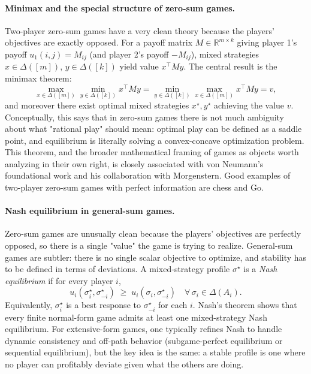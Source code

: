 \documentclass{article}
\begin{document}
\paragraph{Minimax and the special structure of zero-sum games.}
Two-player zero-sum games have a very clean theory because the players’ objectives are exactly opposed. For a payoff matrix \(M\in \mathbb{R}^{m\times k}\) giving player 1’s payoff \(u_1(i,j)=M_{ij}\) (and player 2’s payoff \(-M_{ij}\)), mixed strategies \(x\in \Delta([m])\), \(y\in \Delta([k])\) yield value \(x^\top M y\). The central result is the minimax theorem:
\[
\max_{x\in \Delta([m])}\min_{y\in \Delta([k])} x^\top M y
=
\min_{y\in \Delta([k])}\max_{x\in \Delta([m])} x^\top M y
= v,
\]
and moreover there exist optimal mixed strategies \(x^\star,y^\star\) achieving the value \(v\). Conceptually, this says that in zero-sum games there is not much ambiguity about what "rational play" should mean: optimal play can be defined as a saddle point, and equilibrium is literally solving a convex-concave optimization problem. This theorem, and the broader mathematical framing of games as objects worth analyzing in their own right, is closely associated with von Neumann’s foundational work and his collaboration with Morgenstern. Good examples of two-player zero-sum games with perfect information are chess and Go.

\paragraph{Nash equilibrium in general-sum games.}
Zero-sum games are unusually clean because the players’ objectives are perfectly opposed, so there is a single "value" the game is trying to realize. General-sum games are subtler: there is no single scalar objective to optimize, and stability has to be defined in terms of deviations. A mixed-strategy profile \(\sigma^\star\) is a \emph{Nash equilibrium} if for every player \(i\),
\[
u_i(\sigma_i^\star,\sigma_{-i}^\star)\;\ge\;u_i(\sigma_i,\sigma_{-i}^\star)
\quad \forall\,\sigma_i\in \Delta(A_i).
\]
Equivalently, \(\sigma_i^\star\) is a best response to \(\sigma_{-i}^\star\) for each \(i\). Nash’s theorem shows that every finite normal-form game admits at least one mixed-strategy Nash equilibrium. For extensive-form games, one typically refines Nash to handle dynamic consistency and off-path behavior (subgame-perfect equilibrium or sequential equilibrium), but the key idea is the same: a stable profile is one where no player can profitably deviate given what the others are doing.
\end{document}
